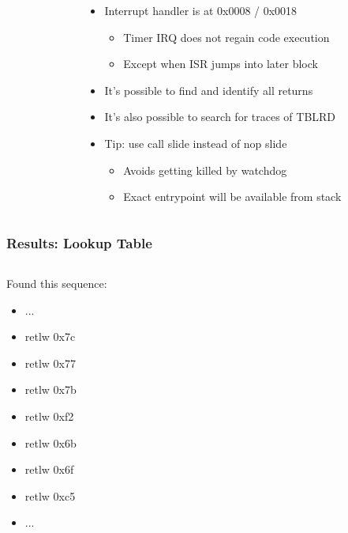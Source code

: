 \documentclass[aspectratio=169]{beamer}
\begin{document}
\begin{frame}
\begin{columns}
\begin{column}{0.2\textwidth}
		\end{column}
		\begin{column}{0.8\textwidth}
			\begin{itemize}
				\item Interrupt handler is at 0x0008 / 0x0018
					\begin{itemize}
						\item Timer IRQ does not regain code execution
						\item Except when ISR jumps into later block
					\end{itemize}
				\item It's possible to find and identify all returns
				\item It's also possible to search for traces of TBLRD
				\item Tip: use call slide instead of nop slide
					\begin{itemize}
						\item Avoids getting killed by watchdog
						\item Exact entrypoint will be available from stack
					\end{itemize}
			\end{itemize}
		\end{column}
	\end{columns}
\end{frame}

\begin{frame}
	\frametitle{Results: Lookup Table}

	\begin{columns}
		\begin{column}{0.4\textwidth}
			Found this sequence:

			\begin{itemize}
				\item ...
				\item retlw 0x7c
				\item retlw 0x77
				\item retlw 0x7b
				\item retlw 0xf2
				\item retlw 0x6b
				\item retlw 0x6f
				\item retlw 0xc5
				\item ...
			\end{itemize}
		\end{column}
		\begin{column}{0.6\textwidth}
		\end{column}
	\end{columns}
\end{frame}
\end{document}
